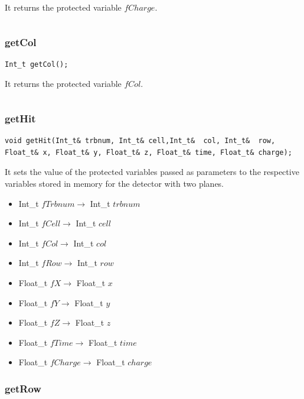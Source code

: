 \documentclass[a4paper]{book}
\begin{document}
It returns the protected variable $fCharge$.

\[\]

\subsubsection{getCol}

\begin{lstlisting}[style=customc]
Int_t getCol();
\end{lstlisting}

It returns the protected variable $fCol$.

\[\]

\subsubsection{getHit}

\begin{lstlisting}[style=customc]
void getHit(Int_t& trbnum, Int_t& cell,Int_t&  col, Int_t&  row, Float_t& x, Float_t& y, Float_t& z, Float_t& time, Float_t& charge);
\end{lstlisting}

It sets the value of the protected variables passed as parameters to the respective variables stored in memory for the detector with two planes.

\begin{itemize}
	\item Int\_t $fTrbnum \rightarrow$ Int\_t $trbnum$
	\item Int\_t $fCell \rightarrow$ Int\_t $cell$
	\item Int\_t $fCol \rightarrow$ Int\_t $col$
	\item Int\_t $fRow \rightarrow$ Int\_t $row$
	\item Float\_t $fX \rightarrow$ Float\_t $x$
	\item Float\_t $fY \rightarrow$ Float\_t $y$
	\item Float\_t $fZ \rightarrow$ Float\_t $z$
	\item Float\_t $fTime \rightarrow$ Float\_t $time$
	\item Float\_t $fCharge \rightarrow$ Float\_t $charge$
\end{itemize}



\subsubsection{getRow}
\end{document}
